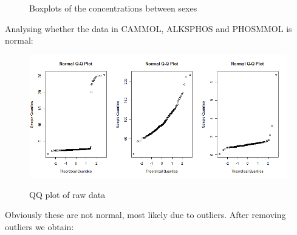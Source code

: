 \documentclass{article}
\begin{document}
\begin{figure}[H]
          \caption{Boxplots of the concentrations between sexes}
          \label{fig:BoxSex}
      \end{figure}

	Analysing whether the data in CAMMOL, ALKSPHOS and PHOSMMOL is normal:
	
	\begin{figure}[H]
		\centering
		{\includegraphics[scale=0.3]{../results/dat1_qq.png}}
		\caption{QQ plot of raw data}
		\label{fig:qq1}
	\end{figure}
	
	Obviously these are not normal, most likely due to outliers. After removing outliers we obtain:
	
\end{document}
